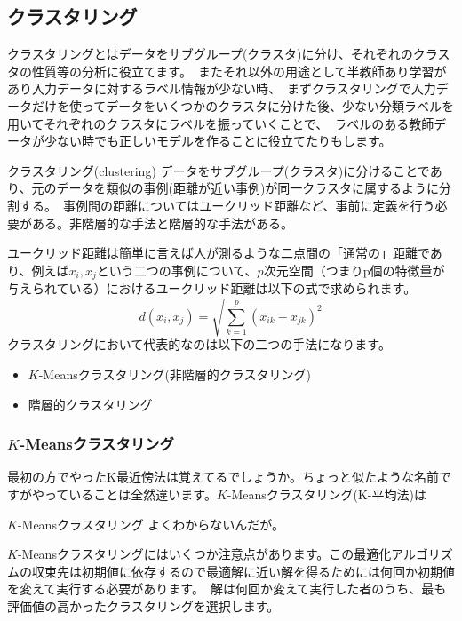 \documentclass[uplatex]{jsarticle}
\begin{document}
\subsection{クラスタリング}
クラスタリングとはデータをサブグループ(クラスタ)に分け、それぞれのクラスタの性質等の分析に役立てます。\
またそれ以外の用途として半教師あり学習があり入力データに対するラベル情報が少ない時、\
まずクラスタリングで入力データだけを使ってデータをいくつかのクラスタに分けた後、少ない分類ラベルを用いてそれぞれのクラスタにラベルを振っていくことで、\
ラベルのある教師データが少ない時でも正しいモデルを作ることに役立てたりもします。
\begin{itembox}[l]{クラスタリング(clustering)}
  データをサブグループ(クラスタ)に分けることであり、元のデータを類似の事例(距離が近い事例)が同一クラスタに属するように分割する。\
  事例間の距離についてはユークリッド距離など、事前に定義を行う必要がある。非階層的な手法と階層的な手法がある。
\end{itembox}
ユークリッド距離は簡単に言えば人が測るような二点間の「通常の」距離であり、例えば$x_i, x_j$という二つの事例について、$p$次元空間（つまりp個の特徴量が与えられている）におけるユークリッド距離は以下の式で求められます。\
$$d(x_i, x_j) = \sqrt{\sum_{k=1}^p (x_{ik} - x_{jk})^2}$$
クラスタリングにおいて代表的なのは以下の二つの手法になります。\
\begin{itemize}
  \item $K$-Meansクラスタリング(非階層的クラスタリング)
  \item 階層的クラスタリング
\end{itemize}
\subsubsection{$K$-Meansクラスタリング}
最初の方でやったK最近傍法は覚えてるでしょうか。ちょっと似たような名前ですがやっていることは全然違います。$K$-Meansクラスタリング(K-平均法)は
\begin{itembox}[l]{$K$-Meansクラスタリング}
  よくわからないんだが。
\end{itembox}

$K$-Meansクラスタリングにはいくつか注意点があります。この最適化アルゴリズムの収束先は初期値に依存するので最適解に近い解を得るためには何回か初期値を変えて実行する必要があります。\
解は何回か変えて実行した者のうち、最も評価値の高かったクラスタリングを選択します。
\end{document}
